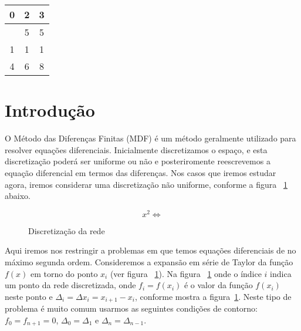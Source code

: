 \begin{table}
\begin{center}
\begin{tabular}{c | c | c}
0 & 2 & 3\\ \hline
\rowcolor{cinza}\multicolumn{1}{c}{5} & \multicolumn{1}{c}{5} & \multicolumn{1}{c}{5} \\
\hline
\rowcolor[gray]{.8} 1 & 1 & 1\\
4 & 6 & 8
\end{tabular}
\end{center}
\end{table}


\section{Introdução}

O Método das Diferenças Finitas (MDF) é um método geralmente
utilizado para resolver equações diferenciais. Inicialmente
discretizamos o espaço, e esta discretização poderá ser
uniforme ou não e posteriromente reescrevemos a equação\cite[ver pag. 34]{RLandau97}
diferencial em termos das diferenças. Nos casos que iremos estudar
agora, iremos considerar uma discretização não uniforme,
conforme a figura ~\ref{fig2} abaixo.

\begin{equation}
   x^2\Longleftrightarrow
\end{equation} 

\begin{figure}[htb]
\begin{center}

\end{center}
\vspace{-0.2cm}
\caption{Discretiza\c{c}\~{a}o da rede \label{fig2}}
\end{figure}%


Aqui iremos nos restringir a problemas em que temos equações
diferenciais de no máximo segunda ordem. Consideremos a expansão em 
série de Taylor da função $f(x)$ em torno do ponto $x_{i}$ (ver
figura ~\ref{fig2}). Na figura ~\ref{fig2} onde o índice $i$ indica um
ponto da rede discretizada, onde $f_{i}=f(x_{i})$ é o valor da 
função $f(x_{i})$ neste ponto e $\Delta _{i}=\Delta x_{i}=x_{i+1}-x_{i}$,
conforme mostra a figura~\ref{fig2}. Neste tipo de problema é muito
comum usarmos as seguintes condições de contorno: $f_{0}=f_{n+1}=0$,
$\Delta _{0}=\Delta _{1}$ e $\Delta _{n}=\Delta _{n-1}$.


